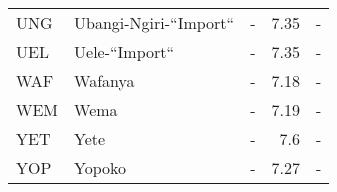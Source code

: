 {{\begin{longtable}{@{}llrrr@{}}
UNG &  \mbox{Ubangi}-Ngiri-“Import“ &           - &          7.35 &                    - \\
UEL &          Uele-“Import“ &           - &          7.35 &                    - \\
WAF &                Wafanya &           - &          7.18 &                    - \\
WEM &                   Wema &           - &          7.19 &                    - \\
YET &                   Yete &           - &           7.6 &                    - \\
YOP &                 Yopoko &           - &          7.27 &                    - \\
\end{longtable}
}}
